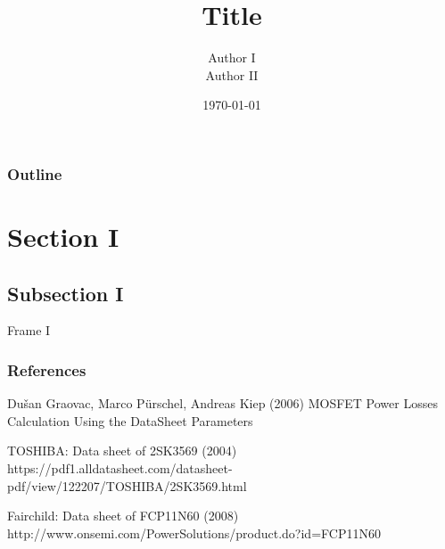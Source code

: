 \documentclass{beamer}
\title[Short title in bottom]{Title}
\author{\footnotesize{Author I \\ Author II}}
\institute[shorthand] %
{
Xi'an Jiaotong University \\ %
\medskip
\textit{author@example.com} %
}
\date{\today} %
\begin{document}
\begin{frame}
\maketitle
\end{frame}

\begin{frame}
\frametitle{Outline} %
\tableofcontents %
\end{frame}


\section{Section I}
\subsection{Subsection I}
\begin{frame}{Frame I}
    
\end{frame}
\begin{frame}
\frametitle{References}
\footnotesize{
\begin{thebibliography}{99} %
 Dušan Graovac, Marco Pürschel, Andreas Kiep (2006)
\newblock MOSFET Power Losses Calculation Using the DataSheet Parameters
\end{thebibliography}
\begin{thebibliography}{99}
 TOSHIBA: Data sheet of 2SK3569 (2004)
\newblock https://pdf1.alldatasheet.com/datasheet-pdf/view/122207/TOSHIBA/2SK3569.html
\end{thebibliography}
\begin{thebibliography}{99}
 Fairchild: Data sheet of FCP11N60 (2008)
\newblock http://www.onsemi.com/PowerSolutions/product.do?id=FCP11N60
\end{thebibliography}
}
\end{frame}
\end{document}
